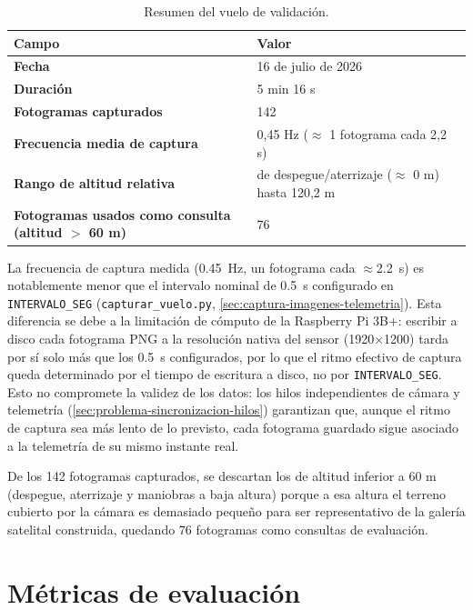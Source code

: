 \begin{table}[htbp]
\centering
\caption{Resumen del vuelo de validación.}
\label{tab:sesiones-vuelo}
\begin{tabularx}{\textwidth}{>{\bfseries}p{}X}
\toprule
\textbf{Campo} & \textbf{Valor} \\
\midrule
Fecha & 16 de julio de 2026 \\
Duración & 5 min 16 s \\
Fotogramas capturados & 142 \\
Frecuencia media de captura & 0,45 Hz ($\approx$ 1 fotograma cada 2,2 s) \\
Rango de altitud relativa & de despegue/aterrizaje ($\approx$ 0 m) hasta 120,2 m \\
Fotogramas usados como consulta (altitud $>$ 60 m) & 76 \\
\bottomrule
\end{tabularx}
\end{table}

La frecuencia de captura medida (\SI{0.45}{\hertz}, un fotograma cada $\approx$\SI{2.2}{\second}) es notablemente menor que el intervalo nominal de \SI{0.5}{\second} configurado en \texttt{INTERVALO\_SEG} (\texttt{capturar\_vuelo.py}, \autoref{sec:captura-imagenes-telemetria}). Esta diferencia se debe a la limitación de cómputo de la Raspberry Pi 3B+: escribir a disco cada fotograma PNG a la resolución nativa del sensor (1920$\times$1200) tarda por sí solo más que los \SI{0.5}{\second} configurados, por lo que el ritmo efectivo de captura queda determinado por el tiempo de escritura a disco, no por \texttt{INTERVALO\_SEG}. Esto no compromete la validez de los datos: los hilos independientes de cámara y telemetría (\autoref{sec:problema-sincronizacion-hilos}) garantizan que, aunque el ritmo de captura sea más lento de lo previsto, cada fotograma guardado sigue asociado a la telemetría de su mismo instante real.

De los 142 fotogramas capturados, se descartan los de altitud inferior a 60 m (despegue, aterrizaje y maniobras a baja altura) porque a esa altura el terreno cubierto por la cámara es demasiado pequeño para ser representativo de la galería satelital construida, quedando 76 fotogramas como consultas de evaluación.

\section{Métricas de evaluación}
\label{sec:metricas-evaluacion}

